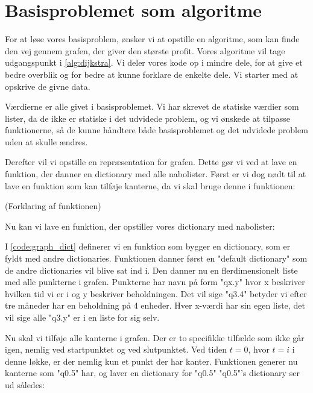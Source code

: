 \section{Basisproblemet som algoritme}
For at løse vores basisproblem, ønsker vi at opstille en algoritme, som kan finde den vej gennem grafen, der giver den største profit. Vores algoritme vil tage udgangspunkt i \autoref{alg:dijkstra}. Vi deler vores kode op i mindre dele, for at give et bedre overblik og for bedre at kunne forklare de enkelte dele. Vi starter med at opskrive de givne data. 



Værdierne er alle givet i basisproblemet. Vi har skrevet de statiske værdier som lister, da de ikke er statiske i det udvidede problem, og vi ønskede at tilpasse funktionerne, så de kunne håndtere både basisproblemet og det udvidede problem uden at skulle ændres. 

Derefter vil vi opstille en repræsentation for grafen. Dette gør vi ved at lave en funktion, der danner en dictionary med alle nabolister. Først er vi dog nødt til at lave en funktion som kan tilføje kanterne, da vi skal bruge denne i funktionen:



(Forklaring af funktionen)

Nu kan vi lave en funktion, der opstiller vores dictionary med nabolister:



I \autoref{code:graph_dict} definerer vi en funktion som bygger en dictionary, som er fyldt med andre dictionaries. Funktionen danner først en "default dictionary" som de andre dictionaries vil blive sat ind i.
Den danner nu en flerdimensionelt liste med alle punkterne i grafen. Punkterne har navn på form "qx.y" hvor x beskriver hvilken tid vi er i og y beskriver beholdningen. Det vil sige "q3.4" betyder vi efter tre måneder har en beholdning på 4 enheder. Hver x-værdi har sin egen liste, det vil sige alle "q3.y" er i en liste for sig selv.

Nu skal vi tilføje alle kanterne i grafen. Der er to specifikke tilfælde som ikke går igen, nemlig ved startpunktet og ved slutpunktet. Ved tiden $t=0$, hvor $t=i$ i denne løkke, er der nemlig kun et punkt der har kanter. Funktionen generer nu kanterne som "q0.5" har, og laver en dictionary for "q0.5" 
"q0.5"'s dictionary ser ud således:

